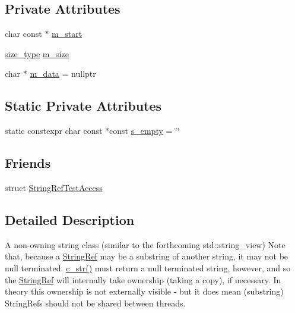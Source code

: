 \subsection*{Private Attributes}
\begin{DoxyCompactItemize}
\item 
char const $\ast$ \hyperlink{class_catch_1_1_string_ref_a0583d4e5ea88c99c121504052a4fcb6c}{m\-\_\-start}
\item 
\hyperlink{class_catch_1_1_string_ref_a06b4db8fc82b197004291cf370b2ba7c}{size\-\_\-type} \hyperlink{class_catch_1_1_string_ref_a91ee253f5b7e43303352186139845753}{m\-\_\-size}
\item 
char $\ast$ \hyperlink{class_catch_1_1_string_ref_ae671eabbedd386aeb334d3da1a904ba5}{m\-\_\-data} = nullptr
\end{DoxyCompactItemize}
\subsection*{Static Private Attributes}
\begin{DoxyCompactItemize}
\item 
static constexpr char const $\ast$const \hyperlink{class_catch_1_1_string_ref_a38d077e89f7f2ce666507ab28dd28653}{s\-\_\-empty} = \char`\"{}\char`\"{}
\end{DoxyCompactItemize}
\subsection*{Friends}
\begin{DoxyCompactItemize}
\item 
struct \hyperlink{class_catch_1_1_string_ref_a420e64e1652de1b0d427775781b018f5}{String\-Ref\-Test\-Access}
\end{DoxyCompactItemize}


\subsection{Detailed Description}
A non-\/owning string class (similar to the forthcoming std\-::string\-\_\-view) Note that, because a \hyperlink{class_catch_1_1_string_ref}{String\-Ref} may be a substring of another string, it may not be null terminated. \hyperlink{class_catch_1_1_string_ref_a1669cb2765e820ca258159676cbd82a5}{c\-\_\-str()} must return a null terminated string, however, and so the \hyperlink{class_catch_1_1_string_ref}{String\-Ref} will internally take ownership (taking a copy), if necessary. In theory this ownership is not externally visible -\/ but it does mean (substring) String\-Refs should not be shared between threads. 

